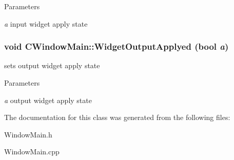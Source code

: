 \begin{DoxyParams}{Parameters}
\item[{\em a}]input widget apply state \end{DoxyParams}
\hypertarget{classCWindowMain_a62085f5b2d09731bba414dac063ba30c}{
\subsubsection[{WidgetOutputApplyed}]{\setlength{\rightskip}{0pt plus 5cm}void CWindowMain::WidgetOutputApplyed (bool {\em a})}}
\label{classCWindowMain_a62085f5b2d09731bba414dac063ba30c}
sets output widget apply state


\begin{DoxyParams}{Parameters}
\item[{\em a}]output widget apply state \end{DoxyParams}


The documentation for this class was generated from the following files:\begin{DoxyCompactItemize}
\item 
WindowMain.h\item 
WindowMain.cpp\end{DoxyCompactItemize}
